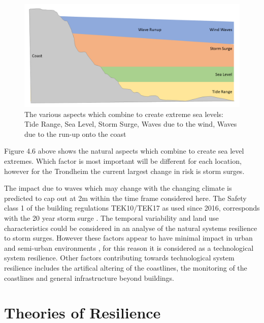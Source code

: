 \begin{figure}[h!]
    \centering
    \includegraphics[width=1\textwidth]{fig_theory/sea level extremes.png}
    \caption{The various aspects which combine to create extreme sea levels: Tide Range, Sea Level, Storm Surge, Waves due to the wind, Waves due to the run-up onto the coast}
    \label{fig:my_label}
\end{figure}

Figure 4.6 above shows the natural aspects which combine to create sea level extremes. Which factor is most important will be different for each location, however for the Trondheim the current largest change in risk is storm surges. 


The impact due to waves which may change with the changing climate is predicted to cap out at 2m within the time frame considered here. The Safety class 1 of the building regulations TEK10/TEK17 as used since 2016, corresponds with the 20 year storm surge \cite{tides_high_2022}. The temporal variability and land use characteristics could be considered in an analyse of the natural systems resilience to storm surges. However these factors appear to have minimal impact in urban and semi-urban environments \cite{hoffken_effects_2020}, for this reason it is considered as a technological system resilience. Other factors contributing towards technological system resilience includes the artifical altering of the coastlines, the monitoring of the coastlines and general infrastructure beyond buildings.

\section{Theories of Resilience }

